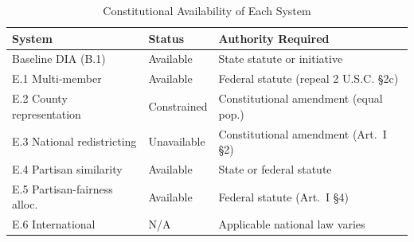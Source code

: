 \begin{table}[ht]
\centering
\caption{Constitutional Availability of Each System}
\label{tab:constitutional}
\begin{tabular}{lll}
\toprule
\textbf{System} & \textbf{Status} & \textbf{Authority Required} \\
\midrule
Baseline DIA (B.1)          & Available    & State statute or initiative \\
E.1 Multi-member            & Available    & Federal statute (repeal 2 U.S.C. \S2c) \\
E.2 County representation   & Constrained  & Constitutional amendment (equal pop.) \\
E.3 National redistricting  & Unavailable  & Constitutional amendment (Art.~I \S2) \\
E.4 Partisan similarity     & Available    & State or federal statute \\
E.5 Partisan-fairness alloc.& Available    & Federal statute (Art.~I \S4) \\
E.6 International           & N/A          & Applicable national law varies \\
\bottomrule
\end{tabular}
\end{table}
